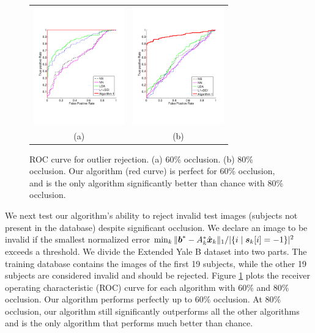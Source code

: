 \begin{figure}
\centering
\begin{tabular}{cc}
\includegraphics[height=2in]{figures_iccv/roc/eYB-60.pdf}&
\includegraphics[height=2in]{figures_iccv/roc/eYB-80.pdf}\\
(a) & (b)
\end{tabular}
\caption{ROC curve for outlier rejection. (a) 60\% occlusion. (b)
80\% occlusion. Our algorithm (red curve) is perfect for 60\% occlusion, and is the only algorithm significantly better than chance with 80\% occlusion.}\label{fig:yale-roc} \vspace{0mm}
\end{figure}

We next test our algorithm's ability to reject invalid test images
(subjects not present in the database) despite significant occlusion.
We declare an image to be invalid if the smallest normalized error
$\min_k \| \boldsymbol{b}^* - A_k^* \hat{{\boldsymbol{x}}}_k \|_1 / | \{ i \mid \boldsymbol{s}_k[i] = -1 \} |^2$ exceeds a threshold.
We divide the Extended Yale B dataset into two parts.
The training database contains the images of the first 19 subjects, while the other 19 subjects
are considered invalid and should be rejected. Figure \ref{fig:yale-roc} plots
the receiver operating characteristic (ROC) curve for each algorithm
with 60\% and 80\% occlusion. Our algorithm performs perfectly up
to 60\% occlusion. At 80\% occlusion, our algorithm still
significantly outperforms all the other algorithms and is the only
algorithm that performs much better than chance.\vspace{0mm}

